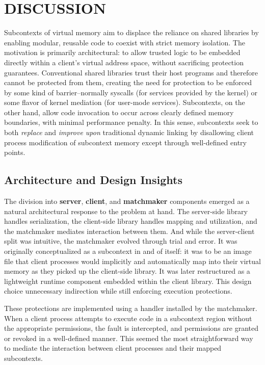 \chapter*{DISCUSSION}
\thispagestyle{fancy}

Subcontexts of virtual memory aim to displace the reliance on shared libraries by enabling modular, reusable code to coexist with strict memory isolation. The motivation is primarily architectural: to allow trusted logic to be embedded directly within a client’s virtual address space, without sacrificing protection guarantees. Conventional shared libraries trust their host programs and therefore cannot be protected from them, creating the need for protection to be enforced by some kind of barrier--normally syscalls (for services provided by the kernel) or some flavor of kernel mediation (for user-mode services). Subcontexts, on the other hand, allow code invocation to occur across clearly defined memory boundaries, with minimal performance penalty. In this sense, subcontexts seek to both \textit{replace} and \textit{improve upon} traditional dynamic linking by disallowing client process modification of subcontext memory except through well-defined entry points.

\section*{Architecture and Design Insights}
The division into \textbf{server}, \textbf{client}, and \textbf{matchmaker} components emerged as a natural architectural response to the problem at hand. The server-side library handles serialization, the client-side library handles mapping and utilization, and the matchmaker mediates interaction between them. And while the server-client split was intuitive, the matchmaker evolved through trial and error. It was originally conceptualized as a subcontext in and of itself: it was to be an image file that client processes would implicitly and automatically map into their virtual memory as they picked up the client-side library. It was later restructured as a lightweight runtime component embedded within the client library. This design choice unnecessary indirection while still enforcing execution protections.

These protections are implemented using a  handler installed by the matchmaker. When a client process attempts to execute code in a subcontext region without the appropriate permissions, the fault is intercepted, and permissions are granted or revoked in a well-defined manner. This seemed the most straightforward way to mediate the interaction between client processes and their mapped subcontexts.

